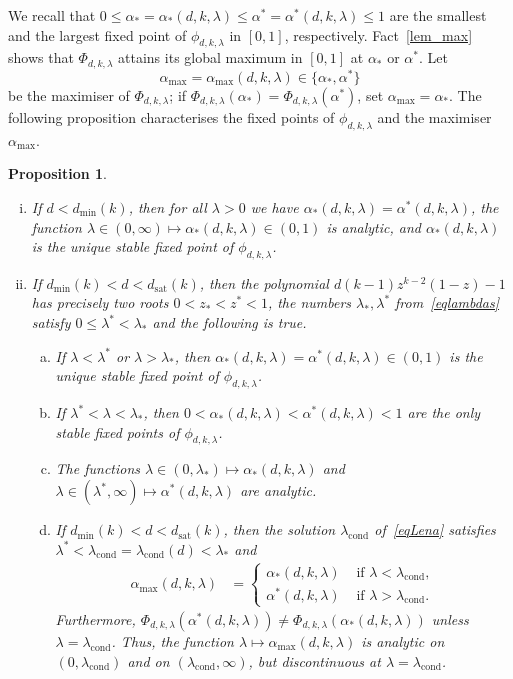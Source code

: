\documentclass[10pt,reqno]{amsart}
\numberwithin{equation}{section}
\newcommand\dmin{d_{\mathrm{min}}}
\newcommand\dsat{d_{\mathrm{sat}}}
\newcommand{\amax}{\alpha_{\max}}
\newcommand{\lcond}{\lambda_{\mathrm{cond}}}
\newtheorem{proposition}[definition]{Proposition}
\newcommand{\ph}{\phi_{d,k,\lambda}}
\newcommand{\Ph}{\Phi_{d,k,\lambda}}
\begin{document}
We recall that $0\leq\alpha_*=\alpha_*(d,k,\lambda)\leq\alpha^*=\alpha^*(d,k,\lambda)\leq1$ are the smallest and the largest fixed point of $\ph$ in $[0,1]$, respectively.
Fact~\ref{lem_max} shows that $\Ph$ attains its global maximum in $[0,1]$ at $\alpha_*$ or $\alpha^*$.
Let $$\amax=\amax(d,k,\lambda)\in\{\alpha_*,\alpha^*\}$$ be the maximiser of $\Ph$; if $\Ph(\alpha_*)=\Ph(\alpha^*)$, set $\amax=\alpha_*$.
The following proposition characterises the fixed points of $\ph$ and the maximiser $\amax$.

\begin{proposition}\label{prop_greg}
~
	\begin{enumerate}[(i)]
		\item If $d<\dmin(k)$, then for all $\lambda>0$ we have $\alpha_*(d,k,\lambda)=\alpha^*(d,k,\lambda)$, the function $\lambda\in(0,\infty)\mapsto\alpha_*(d,k,\lambda)\in(0,1)$ is analytic, and $\alpha_*(d,k,\lambda)$ is the unique stable fixed point of $\ph$.
		\item If $\dmin(k)<d<\dsat(k)$, then the polynomial $d(k-1)z^{k-2}(1-z)-1$ has precisely two roots $0<z_*<z^*<1$, the numbers $\lambda_*,\lambda^*$ from~\eqref{eqlambdas} satisfy $0\leq \lambda^*<\lambda_*$ and the following is true.
			\begin{enumerate}[(a)]
				\item If $\lambda<\lambda^*$ or $\lambda>\lambda_*$, then $\alpha_*(d,k,\lambda)=\alpha^*(d,k,\lambda)\in(0,1)$ is the unique stable fixed point of $\ph$.
				\item If $\lambda^*<\lambda<\lambda_*$, then $0<\alpha_*(d,k,\lambda)<\alpha^*(d,k,\lambda)<1$ are the only stable fixed points of $\ph$.
				\item  The functions $\lambda\in(0,\lambda_*)\mapsto\alpha_*(d,k,\lambda)$ and $\lambda\in(\lambda^*,\infty)\mapsto\alpha^*(d,k,\lambda)$ are analytic.
\item If $\dmin(k)<d<\dsat(k)$, then the solution $\lcond$ of~\eqref{eqLena} satisfies $\lambda^*<\lcond=\lcond(d)<\lambda_*$ and
			\begin{align*}
				\amax(d,k,\lambda)&=\begin{cases}
					\alpha_*(d,k,\lambda)&\mbox{ if }\lambda<\lcond,\\
					\alpha^*(d,k,\lambda)&\mbox{ if }\lambda>\lcond.
				\end{cases}
			\end{align*}
			Furthermore, $\Ph(\alpha^*(d,k,\lambda))\neq\Ph(\alpha_*(d,k,\lambda))$ unless $\lambda=\lcond$.
			Thus, the function $\lambda\mapsto\amax(d,k,\lambda)$ is analytic on $(0,\lcond)$ and on $(\lcond,\infty)$, but discontinuous at $\lambda=\lcond$.
		\end{enumerate}
		\end{enumerate}
	\end{proposition}
\end{document}
